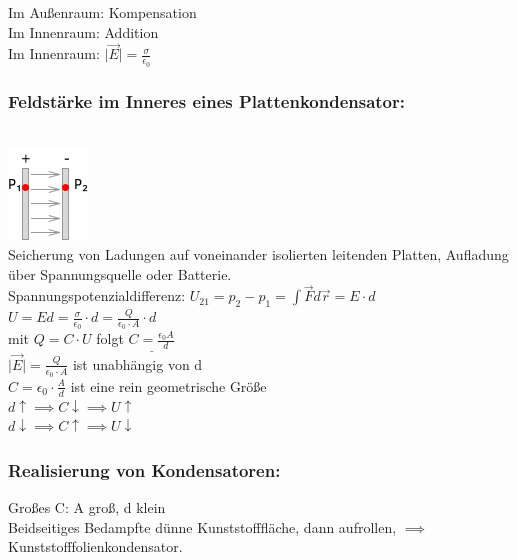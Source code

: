 \documentclass[11pt]{article}
\begin{document}
\noindent Im Au\ss{}enraum: Kompensation\\
Im Innenraum: Addition\\

Im Innenraum: $\vert\vec{E}\vert=\frac{\sigma}{\epsilon_0}$\\

\subsubsection{Feldstärke im Inneres eines Plattenkondensator:}

\hfill\\
\includegraphics{skizzen/14/14_8B7}
\hfill\\

Seicherung von Ladungen auf voneinander isolierten leitenden Platten, Aufladung über Spannungsquelle oder Batterie.\\

Spannungspotenzialdifferenz: $ U_{21}=p_2-p_1=\int \vec{F}d\vec{r}=E\cdot d $\\
$ U = Ed=\frac{\sigma}{\epsilon_0}\cdot d = \frac{Q}{\epsilon_0\cdot A}\cdot d $\\
mit $Q=C\cdot U$ folgt $ \underline{C=\frac{\epsilon_0 A}{d}} $\\

$\boxed{\vert\vec{E}\vert=\frac{Q}{\epsilon_0\cdot A}}$ ist unabhängig von d\\

$\boxed{C=\epsilon_0\cdot \frac{A}{d}}$ ist eine rein geometrische Grö\ss{}e\\

$d\uparrow \implies C\downarrow \implies U\uparrow$\\

$d\downarrow \implies C\uparrow \implies U \downarrow$\\


\subsubsection{Realisierung von Kondensatoren:}

Gro\ss{}es C: A gro\ss{}, d klein\\
Beidseitiges Bedampfte dünne Kunststofffläche, dann aufrollen, $\implies$ Kunststofffolienkondensator.\\
\end{document}
